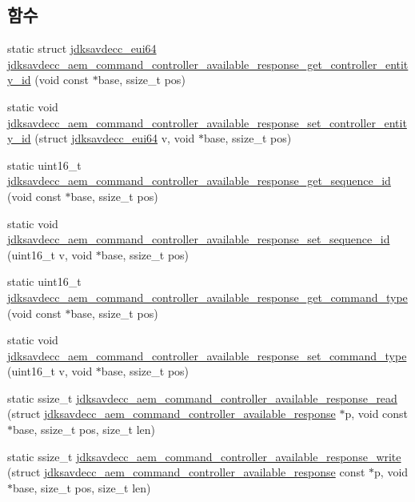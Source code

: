 \subsection*{함수}
\begin{DoxyCompactItemize}
\item 
static struct \hyperlink{structjdksavdecc__eui64}{jdksavdecc\+\_\+eui64} \hyperlink{group__command__controller__available__response_gab963e2b69833cff0a4b63600f554724d}{jdksavdecc\+\_\+aem\+\_\+command\+\_\+controller\+\_\+available\+\_\+response\+\_\+get\+\_\+controller\+\_\+entity\+\_\+id} (void const $\ast$base, ssize\+\_\+t pos)
\item 
static void \hyperlink{group__command__controller__available__response_ga23e60865f5ccd23084f3a07dbf0b76fa}{jdksavdecc\+\_\+aem\+\_\+command\+\_\+controller\+\_\+available\+\_\+response\+\_\+set\+\_\+controller\+\_\+entity\+\_\+id} (struct \hyperlink{structjdksavdecc__eui64}{jdksavdecc\+\_\+eui64} v, void $\ast$base, ssize\+\_\+t pos)
\item 
static uint16\+\_\+t \hyperlink{group__command__controller__available__response_gad7f66fd1473d97fc33a40c8a2a8cedab}{jdksavdecc\+\_\+aem\+\_\+command\+\_\+controller\+\_\+available\+\_\+response\+\_\+get\+\_\+sequence\+\_\+id} (void const $\ast$base, ssize\+\_\+t pos)
\item 
static void \hyperlink{group__command__controller__available__response_gac24eb6fdfc715f5851baac64341759f0}{jdksavdecc\+\_\+aem\+\_\+command\+\_\+controller\+\_\+available\+\_\+response\+\_\+set\+\_\+sequence\+\_\+id} (uint16\+\_\+t v, void $\ast$base, ssize\+\_\+t pos)
\item 
static uint16\+\_\+t \hyperlink{group__command__controller__available__response_ga0112af13a303e3a8ac924cd7503a0b22}{jdksavdecc\+\_\+aem\+\_\+command\+\_\+controller\+\_\+available\+\_\+response\+\_\+get\+\_\+command\+\_\+type} (void const $\ast$base, ssize\+\_\+t pos)
\item 
static void \hyperlink{group__command__controller__available__response_ga1c165573e762d34dade9d01456ff3254}{jdksavdecc\+\_\+aem\+\_\+command\+\_\+controller\+\_\+available\+\_\+response\+\_\+set\+\_\+command\+\_\+type} (uint16\+\_\+t v, void $\ast$base, ssize\+\_\+t pos)
\item 
static ssize\+\_\+t \hyperlink{group__command__controller__available__response_gafb1b0dede49f19f13ef16c8308cfc5f6}{jdksavdecc\+\_\+aem\+\_\+command\+\_\+controller\+\_\+available\+\_\+response\+\_\+read} (struct \hyperlink{structjdksavdecc__aem__command__controller__available__response}{jdksavdecc\+\_\+aem\+\_\+command\+\_\+controller\+\_\+available\+\_\+response} $\ast$p, void const $\ast$base, ssize\+\_\+t pos, size\+\_\+t len)
\item 
static ssize\+\_\+t \hyperlink{group__command__controller__available__response_gaf98aac9108a634dc0ac738e970e4ce19}{jdksavdecc\+\_\+aem\+\_\+command\+\_\+controller\+\_\+available\+\_\+response\+\_\+write} (struct \hyperlink{structjdksavdecc__aem__command__controller__available__response}{jdksavdecc\+\_\+aem\+\_\+command\+\_\+controller\+\_\+available\+\_\+response} const $\ast$p, void $\ast$base, size\+\_\+t pos, size\+\_\+t len)
\end{DoxyCompactItemize}


